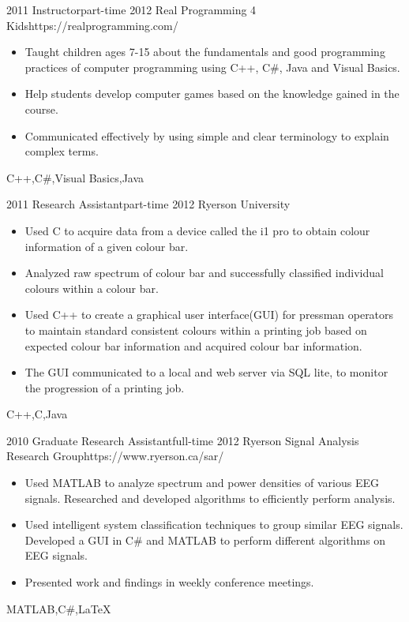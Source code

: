 \begin{experiences}
	\emptySeparator
	
	
	\myExperience
	{2011}       {Instructor}{part-time}
	{2012}      {Real Programming 4 Kids}{https://realprogramming.com/}
	{
		\begin{itemize}
			\item Taught children ages 7-15 about the fundamentals and good programming practices of computer programming using C++, C\#, Java and Visual Basics.
			\item Help students develop computer games based on the knowledge gained in the course.
			\item Communicated effectively by using simple and clear terminology to explain complex terms.
		\end{itemize}
	}
	{C++,C\#,Visual Basics,Java}
	
	\emptySeparator

	\myExperience
	{2011}       {Research Assistant}{part-time}
	{2012}      {Ryerson University}{}
	{
		\begin{itemize}
			\item Used C to acquire data from a device called the i1 pro to obtain colour information of a given colour bar.
			\item Analyzed raw spectrum of colour bar and successfully classified individual colours within a colour bar.
			\item Used C++ to create a graphical user interface(GUI) for pressman operators to 	maintain standard consistent colours within a printing job based on expected colour bar information and acquired colour bar information.
			\item The GUI communicated to a local and web server via SQL lite, to monitor the progression of a printing job.
		\end{itemize}
	}
	{C++,C,Java}
	
	\emptySeparator
	
	\myExperience
	{2010}       {Graduate Research Assistant}{full-time}
	{2012}      {Ryerson Signal Analysis Research Group}{https://www.ryerson.ca/sar/}
	{
		\begin{itemize}
			\item Used MATLAB to analyze spectrum and power densities of various EEG signals. Researched and developed algorithms to efficiently perform analysis.
			\item Used intelligent system classification techniques to group similar EEG signals. Developed a GUI in C\# and MATLAB to perform different algorithms on EEG signals.
			\item  Presented work and findings in weekly conference meetings.
		\end{itemize}
	}
	{MATLAB,C\#,\LaTeX}
	
\end{experiences}

